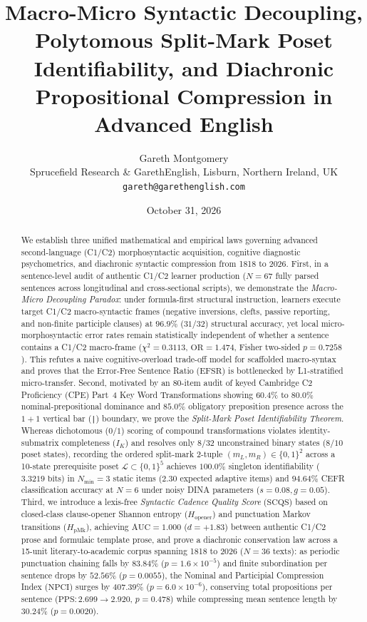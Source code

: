 \documentclass[11pt,reqno]{article}
\title{\textbf{Macro-Micro Syntactic Decoupling, Polytomous Split-Mark Poset Identifiability, and Diachronic Propositional Compression in Advanced English}}
\author{Gareth Montgomery\\
\small Sprucefield Research \& GarethEnglish, Lisburn, Northern Ireland, UK\\
\small \texttt{gareth@garethenglish.com}}
\date{October 31, 2026}
\begin{document}
\maketitle

\begin{abstract}
We establish three unified mathematical and empirical laws governing advanced second-language (C1/C2) morphosyntactic acquisition, cognitive diagnostic psychometrics, and diachronic syntactic compression from 1818 to 2026. First, in a sentence-level audit of authentic C1/C2 learner production ($N=67$ fully parsed sentences across longitudinal and cross-sectional scripts), we demonstrate the \emph{Macro-Micro Decoupling Paradox}: under formula-first structural instruction, learners execute target C1/C2 macro-syntactic frames (negative inversions, clefts, passive reporting, and non-finite participle clauses) at $96.9\%$ ($31/32$) structural accuracy, yet local micro-morphosyntactic error rates remain statistically independent of whether a sentence contains a C1/C2 macro-frame ($\chi^2 = 0.3113$, $\mathrm{OR} = 1.474$, Fisher two-sided $p = 0.7258$). This refutes a naive cognitive-overload trade-off model for scaffolded macro-syntax and proves that the Error-Free Sentence Ratio ($\mathrm{EFSR}$) is bottlenecked by L1-stratified micro-transfer. Second, motivated by an 80-item audit of keyed Cambridge C2 Proficiency (CPE) Part~4 Key Word Transformations showing $60.4\%$ to $80.0\%$ nominal-prepositional dominance and $85.0\%$ obligatory preposition presence across the $1+1$ vertical bar (\texttt{|}) boundary, we prove the \emph{Split-Mark Poset Identifiability Theorem}. Whereas dichotomous ($0/1$) scoring of compound transformations violates identity-submatrix completeness ($I_K$) and resolves only $8/32$ unconstrained binary states ($8/10$ poset states), recording the ordered split-mark 2-tuple $(m_L, m_R) \in \{0,1\}^2$ across a 10-state prerequisite poset $\mathcal{L} \subset \{0,1\}^5$ achieves $100.0\%$ singleton identifiability ($3.3219\text{ bits}$) in $N_{\min} = 3$ static items ($2.30$ expected adaptive items) and $94.64\%$ CEFR classification accuracy at $N=6$ under noisy DINA parameters ($s=0.08, g=0.05$). Third, we introduce a lexis-free \emph{Syntactic Cadence Quality Score} ($\mathrm{SCQS}$) based on closed-class clause-opener Shannon entropy ($H_{\mathrm{opener}}$) and punctuation Markov transitions ($H_{\mathrm{pMk}}$), achieving $\mathrm{AUC} = 1.000$ ($d = +1.83$) between authentic C1/C2 prose and formulaic template prose, and prove a diachronic conservation law across a 15-unit literary-to-academic corpus spanning 1818 to 2026 ($N=36$ texts): as periodic punctuation chaining falls by $83.84\%$ ($p = 1.6\times 10^{-5}$) and finite subordination per sentence drops by $52.56\%$ ($p = 0.0055$), the Nominal and Participial Compression Index ($\mathrm{NPCI}$) surges by $407.39\%$ ($p = 6.0\times 10^{-6}$), conserving total propositions per sentence ($\mathrm{PPS}: 2.699 \to 2.920$, $p = 0.478$) while compressing mean sentence length by $30.24\%$ ($p = 0.0020$).
\end{abstract}
\end{document}
